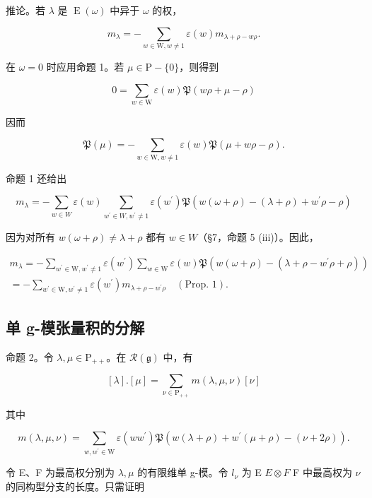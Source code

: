 推论。若 \(\lambda\) 是 \(\operatorname{E}(\omega)\) 中异于 \(\omega\) 的权，

\[
m _ {\lambda} = - \sum_ {w \in \mathrm{W}, w \neq 1} \varepsilon (w) m _ {\lambda + \rho - w \rho}.
\]

在 \(\omega = 0\) 时应用命题 1。若 \(\mu \in \mathrm{P} - \{0\}\)，则得到

\[
0 = \sum_ {w \in \mathrm{W}} \varepsilon (w) \mathfrak {P} (w \rho + \mu - \rho)
\]

因而

\[
\mathfrak {P} (\mu) = - \sum_ {w \in \mathrm{W}, w \neq 1} \varepsilon (w) \mathfrak {P} (\mu + w \rho - \rho).\tag{1}
\]

命题 1 还给出

\[
m _ {\lambda} = - \sum_ {w \in W} \varepsilon (w) \sum_ {w ^ {\prime} \in W, w ^ {\prime} \neq 1} \varepsilon (w ^ {\prime}) \mathfrak {P} (w (\omega + \rho) - (\lambda + \rho) + w ^ {\prime} \rho - \rho)
\]

因为对所有 \(w(\omega + \rho) \neq \lambda + \rho\) 都有 \(w \in W\)（§7，命题 5 (iii)）。因此，

\[
\begin{array}{l} m _ {\lambda} = - \sum_ {w ^ {\prime} \in \mathrm{W}, w ^ {\prime} \neq 1} \varepsilon (w ^ {\prime}) \sum_ {w \in \mathrm{W}} \varepsilon (w) \mathfrak {P} (w (\omega + \rho) - (\lambda + \rho - w ^ {\prime} \rho + \rho)) \\ = - \sum_ {w ^ {\prime} \in \mathrm{W}, w ^ {\prime} \neq 1} \varepsilon (w ^ {\prime}) m _ {\lambda + \rho - w ^ {\prime} \rho} \quad (\text {Prop. 1}). \end{array}
\]

\subsection{单 g-模张量积的分解}

命题 2。令 \(\lambda, \mu \in \mathrm{P}_{++}\)。在 \(\mathcal{R}(\mathfrak{g})\) 中，有

\[
[ \lambda ]. [ \mu ] = \sum_ {\nu \in \mathrm{P} _ {+ +}} m (\lambda , \mu , \nu) [ \nu ]
\]

其中

\[
m (\lambda , \mu , \nu) = \sum_ {w, w ^ {\prime} \in \mathrm{W}} \varepsilon (w w ^ {\prime}) \mathfrak {P} (w (\lambda + \rho) + w ^ {\prime} (\mu + \rho) - (\nu + 2 \rho)).
\]

令 E、F 为最高权分别为 \(\lambda, \mu\) 的有限维单 g-模。令 \(l_{\nu}\) 为 E \(E \otimes F\) F 中最高权为 \(\nu\) 的同构型分支的长度。只需证明

